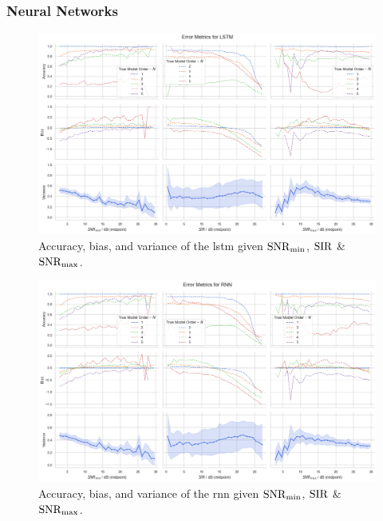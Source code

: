 \subsubsection{Neural Networks}
\begin{figure}[H]
    \centering
    \includegraphics[width=\textwidth]{figures/07_Evaluation/snr_sir/lstm_3x3.png}
    \caption{Accuracy, bias, and variance of the \gls{lstm} given \( \mathrm{SNR}_{\min} \), \( \mathrm{SIR} \) \& \( \mathrm{SNR}_{\max} \).}
    \label{fig:eval_grids/lstm}
\end{figure}
\begin{figure}[H]
    \centering
    \includegraphics[width=\textwidth]{figures/07_Evaluation/snr_sir/rnn_3x3.png}
    \caption{Accuracy, bias, and variance of the \gls{rnn} given \( \mathrm{SNR}_{\min} \), \( \mathrm{SIR} \) \& \( \mathrm{SNR}_{\max} \).}
    \label{fig:eval_grids/rnn}
\end{figure}
